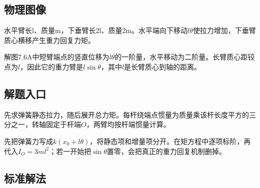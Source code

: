 \documentclass[UTF8,fontset=fandol,a4paper,11pt]{ctexart}
\begin{document}

\subsection*{物理图像}

水平臂长l、质量m，下垂臂长2l、质量2m。水平端向下移动\(l\theta\)使拉力增加，下垂臂质心横移产生重力回复力矩。

解图7.6A中短臂端点的竖直位移为$l\theta$的一阶量，水平移动为二阶量。长臂质心距铰点为$l$，因此它的重力臂是$l\sin\theta$，其中$l$是长臂质心到轴的距离。




\subsection*{解题入口}

先求弹簧静态拉力，随后展开总力矩。每杆绕端点惯量为质量乘该杆长度平方的三分之一，转轴固定于杆端$O$，两臂均按杆端惯量计算。

先把弹簧力写成$k(x_0+l\theta)$，将静态项和增量项分开。在矩方程中逐项标阶，再代入$I_O=3ml^2$；若一开始把$\sin\theta$置零，会把真正的重力回复机制删掉。





\subsection*{标准解法}
\end{document}
